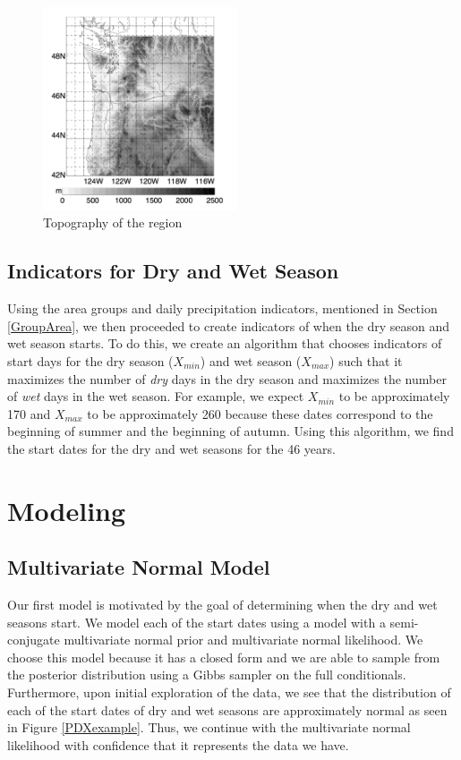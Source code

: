 \documentclass{article}
\begin{document}
\begin{figure}[h!]
\centering
\includegraphics[width = .4\textwidth, height = 6cm]{topography}
\caption{Topography of the region }
\label{fig:topo}
\end{figure}


\subsection{Indicators for Dry and Wet Season}
Using the area groups and daily precipitation indicators, mentioned in Section \ref{GroupArea}, we then proceeded to create indicators of when the dry season and wet season starts. To do this, we create an algorithm that chooses indicators of start days for  the dry season ($X_{min}$) and wet season ($X_{max}$) such that it maximizes the number of \textit{dry} days in the dry season and maximizes the number of \textit{wet} days in the wet season. For example, we expect $X_{min}$ to be approximately 170 and $X_{max}$ to be approximately 260 because these dates correspond to the beginning of summer and the beginning of autumn. Using this algorithm, we find the start dates for the dry and wet seasons for the 46 years.


\section{Modeling}
\subsection{Multivariate Normal Model}
Our first model is motivated by the goal of determining when the dry and wet seasons start. We model each of the start dates using a model with a semi-conjugate multivariate normal prior and multivariate normal likelihood. We choose this model because it has a closed form and we are able to sample from the posterior distribution using a Gibbs sampler on the full conditionals. Furthermore, upon initial exploration of the data, we see that the distribution of each of the start dates of dry and wet seasons are approximately normal as seen in Figure \ref{PDXexample}. Thus, we continue with the multivariate normal likelihood with confidence that it represents the data we have. 
\end{document}
